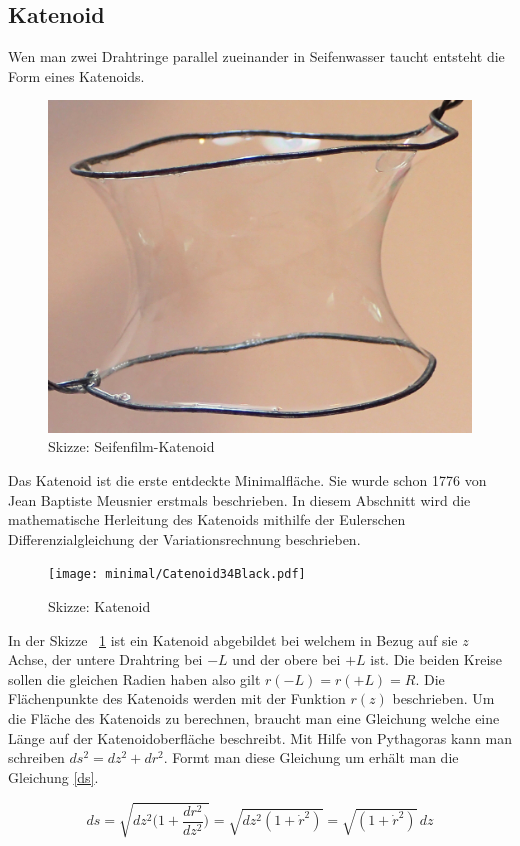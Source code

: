 \begin{refsection}
\subsection{Katenoid}
Wen man zwei Drahtringe parallel zueinander in Seifenwasser taucht entsteht die Form eines Katenoids. 
\begin{figure}[H]
  \centering
  \includegraphics[scale=0.5]{minimal/Cartenoid_Foto.png}
  \caption{Skizze: Seifenfilm-Katenoid} 
\end{figure}
Das Katenoid ist die erste entdeckte Minimalfläche.
Sie wurde schon 1776 von Jean Baptiste Meusnier erstmals beschrieben.
In diesem Abschnitt wird die mathematische Herleitung des Katenoids mithilfe der Eulerschen Differenzialgleichung der Variationsrechnung beschrieben.
\begin{figure}[H]
  \centering
  \texttt{[image: minimal/Catenoid34Black.pdf]}
  \caption{Skizze: Katenoid} 
  \label{Skizze: Katenoid}
\end{figure}
In der Skizze ~\ref{Skizze: Katenoid} ist ein Katenoid abgebildet bei welchem in Bezug auf sie $z$ Achse, der untere Drahtring bei $-L$ und der obere bei $+L$ ist. 
Die beiden Kreise sollen die gleichen Radien haben also gilt $r(-L)=r(+L)=R$. Die Flächenpunkte des Katenoids werden mit der Funktion $r(z)$ beschrieben. 
Um die Fläche des Katenoids zu berechnen, braucht man eine Gleichung welche eine Länge auf der Katenoidoberfläche beschreibt. Mit Hilfe von Pythagoras kann man schreiben $ds^2=dz^2+dr^2$.
Formt man diese Gleichung um erhält man die Gleichung \eqref{ds}.

\begin{equation} \label{ds}
  ds=\sqrt{dz^2\bigg(1+\frac{dr^2}{dz^2}\bigg)}= \sqrt{dz^2(1+\dot r^2)}=\sqrt{(1+\dot r^2)}\,dz
\end{equation}

\end{refsection}
